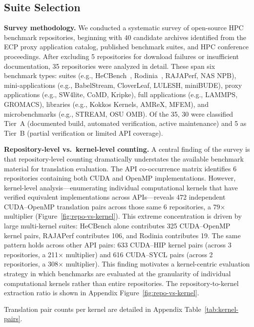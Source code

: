 \documentclass[conference]{IEEEtran}
\begin{document}
\subsection{Suite Selection}
\label{sec:suite-selection}

\textbf{Survey methodology.} We conducted a systematic survey of open-source HPC benchmark repositories, beginning with 40 candidate archives identified from the ECP proxy application catalog, published benchmark suites, and HPC conference proceedings. After excluding 5 repositories for download failures or insufficient documentation, 35 repositories were analyzed in detail. These span six benchmark types: suites (e.g., HeCBench~\cite{HeCBench2023}, Rodinia~\cite{Rodinia2009}, RAJAPerf, NAS NPB), mini-applications (e.g., BabelStream, CloverLeaf, LULESH, miniBUDE), proxy applications (e.g., SW4lite, CoMD, Kripke), full applications (e.g., LAMMPS, GROMACS), libraries (e.g., Kokkos Kernels, AMReX, MFEM), and microbenchmarks (e.g., STREAM, OSU OMB). Of the 35, 30 were classified Tier~A (documented build, automated verification, active maintenance) and 5 as Tier~B (partial verification or limited API coverage).

\textbf{Repository-level vs.\ kernel-level counting.} A central finding of the survey is that repository-level counting dramatically understates the available benchmark material for translation evaluation. The API co-occurrence matrix identifies 6 repositories containing both CUDA and OpenMP implementations. However, kernel-level analysis---enumerating individual computational kernels that have verified equivalent implementations across APIs---reveals 472 independent CUDA--OpenMP translation pairs across those same 6 repositories, a 79$\times$ multiplier (Figure~\ref{fig:repo-vs-kernel}). This extreme concentration is driven by large multi-kernel suites: HeCBench alone contributes 325 CUDA--OpenMP kernel pairs, RAJAPerf contributes 106, and Rodinia contributes 19. The same pattern holds across other API pairs: 633 CUDA--HIP kernel pairs (across 3 repositories, a 211$\times$ multiplier) and 616 CUDA--SYCL pairs (across 2 repositories, a 308$\times$ multiplier). This finding motivates a kernel-centric evaluation strategy in which benchmarks are evaluated at the granularity of individual computational kernels rather than entire repositories.
The repository-to-kernel extraction ratio is shown in Appendix Figure~\ref{fig:repo-vs-kernel}.

Translation pair counts per kernel are detailed in Appendix Table~\ref{tab:kernel-pairs}.
\end{document}

